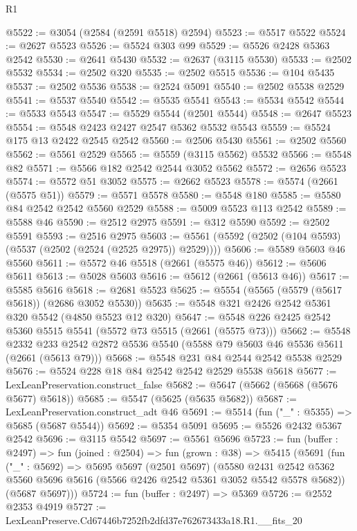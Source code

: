 \begin{lexlean}{R1}
\begin{coremodule}
@5522 := @3054 (@2584 (@2591 @5518) @2594)
@5523 := @5517 @5522
@5524 := @2627 @5523
@5526 := @5524 @303 @99
@5529 := @5526 @2428 @5363 @2542
@5530 := @2641 @5430
@5532 := @2637 (@3115 @5530)
@5533 := @2502 @5532
@5534 := @2502 @320
@5535 := @2502 @5515
@5536 := @104 @5435
@5537 := @2502 @5536
@5538 := @2524 @5091
@5540 := @2502 @5538 @2529
@5541 := @5537 @5540
@5542 := @5535 @5541
@5543 := @5534 @5542
@5544 := @5533 @5543
@5547 := @5529 @5544 (@2501 @5544)
@5548 := @2647 @5523
@5554 := @5548 @2423 @2427 @2547 @5362 @5532 @5543
@5559 := @5524 @175 @13 @2422 @2545 @2542
@5560 := @2506 @5430
@5561 := @2502 @5560
@5562 := @5561 @2529
@5565 := @5559 (@3115 @5562) @5532
@5566 := @5548 @82
@5571 := @5566 @182 @2542 @2544 @3052 @5562
@5572 := @2656 @5523
@5574 := @5572 @51 @3052
@5575 := @2662 @5523
@5578 := @5574 (@2661 (@5575 @51))
@5579 := @5571 @5578
@5580 := @5548 @180
@5585 := @5580 @84 @2542 @2542 @5560 @2529
@5588 := @5009 @5523 @113 @2542
@5589 := @5588 @46
@5590 := @2512 @2975
@5591 := @312 @5590
@5592 := @2502 @5591
@5593 := @2516 @2975
@5603 := @5561 (@5592 (@2502 (@104 @5593) (@5537 (@2502 (@2524 (@2525 @2975)) @2529))))
@5606 := @5589 @5603 @46 @5560
@5611 := @5572 @46 @5518 (@2661 (@5575 @46))
@5612 := @5606 @5611
@5613 := @5028 @5603
@5616 := @5612 (@2661 (@5613 @46))
@5617 := @5585 @5616
@5618 := @2681 @5523
@5625 := @5554 (@5565 (@5579 (@5617 @5618)) (@2686 @3052 @5530))
@5635 := @5548 @321 @2426 @2542 @5361 @320 @5542 (@4850 @5523 @12 @320)
@5647 := @5548 @226 @2425 @2542 @5360 @5515 @5541 (@5572 @73 @5515 (@2661 (@5575 @73)))
@5662 := @5548
    @2332
    @233
    @2542
    @2872
    @5536
    @5540
    (@5588 @79 @5603 @46 @5536 @5611 (@2661 (@5613 @79)))
@5668 := @5548 @231 @84 @2544 @2542 @5538 @2529
@5676 := @5524 @228 @18 @84 @2542 @2542 @2529 @5538 @5618
@5677 := LexLeanPreservation.construct_false
@5682 := @5647 (@5662 (@5668 (@5676 @5677) @5618))
@5685 := @5547 (@5625 (@5635 @5682))
@5687 := LexLeanPreservation.construct_adt @46
@5691 := @5514 (fun ("_" : @5355) => @5685 (@5687 @5544))
@5692 := @5354 @5091
@5695 := @5526 @2432 @5367 @2542
@5696 := @3115 @5542
@5697 := @5561 @5696
@5723 := fun (buffer : @2497) =>
  fun (joined : @2504) =>
  fun (grown : @38) =>
  @5415
    (@5691
      (fun ("_" : @5692) =>
      @5695
        @5697
        (@2501 @5697)
        (@5580
          @2431
          @2542
          @5362
          @5560
          @5696
          @5616
          (@5566 @2426 @2542 @5361 @3052 @5542 @5578 @5682))
        (@5687 @5697)))
@5724 := fun (buffer : @2497) => @5369
@5726 := @2552 @2353 @4919
@5727 := LexLeanPreserve.Cd67446b7252fb2dfd37e762673433a18.R1.__fits_20

\end{coremodule}
\end{lexlean}
